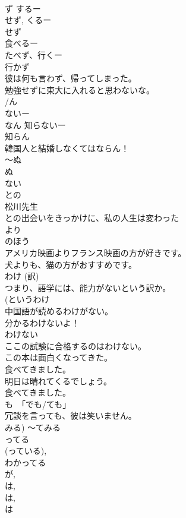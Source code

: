 \documentclass[8pt]{extreport}
\begin{document}
\begin{CJK}{UTF8}{min}
\\	ず するー
\\	せず, くるー
\\	せず
\\	食べるー
\\	たべず、行くー
\\	行かず
\\	彼は何も言わず、帰ってしまった。
\\	勉強せずに東大に入れると思わないな。
\\	/ん	
\\	ないー
\\	なん  知らないー
\\	知らん 
\\	韓国人と結婚しなくてはならん！
\\	～ぬ	
\\	ぬ 
\\	ない 
\\	との	
\\	松川先生
\\	との出会いをきっかけに、私の人生は変わった 
\\	より
\\	のほう	
\\	アメリカ映画よりフランス映画の方が好きです。
\\	犬よりも、猫の方がおすすめです。
\\	わけ (訳)	
\\	つまり、語学には、能力がないという訳か。
\\	(というわけ 
\\	中国語が読めるわけがない。
\\	分かるわけないよ！
\\	わけない	
\\	ここの試験に合格するのはわけない。
\\	この本は面白くなってきた。
\\	食べてきました。
\\	明日は晴れてくるでしょう。
\\	食べてきました。
\\	も　「でも/ても」	
\\	冗談を言っても、彼は笑いません。
\\	みる) 〜てみる	
\\	ってる 
\\	(っている), 
\\	わかってる 
\\	が, 
\\	は, 
\\	は, 
\\	は	

\end{CJK}
\end{document}

